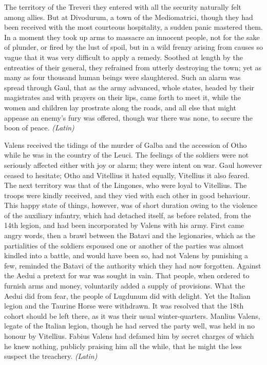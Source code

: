 The territory of the Treveri they entered with all the security naturally felt among allies. But at Divodurum, a town of the Mediomatrici, though they had been received with the most courteous hospitality, a sudden panic mastered them. In a moment they took up arms to massacre an innocent people, not for the sake of plunder, or fired by the lust of spoil, but in a wild frenzy arising from causes so vague that it was very difficult to apply a remedy. Soothed at length by the entreaties of their general, they refrained from utterly destroying the town; yet as many as four thousand human beings were slaughtered. Such an alarm was spread through Gaul, that as the army advanced, whole states, headed by their magistrates and with prayers on their lips, came forth to meet it, while the women and children lay prostrate along the roads, and all else that might appease an enemy's fury was offered, though war there was none, to secure the boon of peace. \emph{(Latin)}


Valens received the tidings of the murder of Galba and the accession of Otho while he was in the country of the Leuci. The feelings of the soldiers were not seriously affected either with joy or alarm; they were intent on war. Gaul however ceased to hesitate; Otho and Vitellius it hated equally, Vitellius it also feared. The next territory was that of the Lingones, who were loyal to Vitellius. The troops were kindly received, and they vied with each other in good behaviour. This happy state of things, however, was of short duration owing to the violence of the auxiliary infantry, which had detached itself, as before related, from the 14th legion, and had been incorporated by Valens with his army. First came angry words, then a brawl between the Batavi and the legionaries, which as the partialities of the soldiers espoused one or another of the parties was almost kindled into a battle, and would have been so, had not Valens by punishing a few, reminded the Batavi of the authority which they had now forgotten. Against the Aedui a pretext for war was sought in vain. That people, when ordered to furnish arms and money, voluntarily added a supply of provisions. What the Aedui did from fear, the people of Lugdunum did with delight. Yet the Italian legion and the Taurine Horse were withdrawn. It was resolved that the 18th cohort should be left there, as it was their usual winter-quarters. Manlius Valens, legate of the Italian legion, though he had served the party well, was held in no honour by Vitellius. Fabius Valens had defamed him by secret charges of which he knew nothing, publicly praising him all the while, that he might the less suspect the treachery. \emph{(Latin)}


